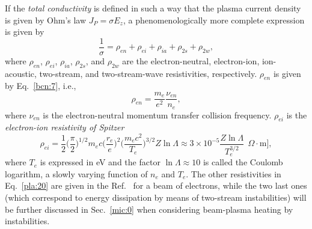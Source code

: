 \documentclass [12pt,a4paper,     ]{report} %
\begin{document}
   If the \emph{total conductivity} is defined in such a way that the plasma current density is given by Ohm's law $J_P=\sigma E_z$, a phenomenologically more complete expression is given by \cite{IYYEN1989-}
%
\begin{equation}\label{pla:20} %
   \frac{1}{\sigma} = \rho_{en} + \rho_{ei} + \rho_{ia} + \rho_{2s} + \rho_{2w},
\end{equation}
%
where $\rho_{en}$, $\rho_{ei}$, $\rho_{ia}$, $\rho_{2s}$, and $\rho_{2w}$ are the electron-neutral, electron-ion, ion-acoustic, two-stream, and two-stream-wave resistivities, respectively.  $\rho_{en}$ is given by Eq.~\eqref{bcn:7}, i.e.,
%
\begin{equation}\label{pla:21} %
        \rho_{en} =  \frac{m_e}{e^2} \frac{\nu_{en}}{n_e},
\end{equation}
%
where $\nu_{en}$ is the electron-neutral momentum transfer collision frequency.  $\rho_{ei}$ is the \emph{electron-ion resistivity of Spitzer} \cite{SPITZ1956-}
%
\begin{equation}\label{pla:22} %
        \rho_{ei} =  \frac{1}{2} \bigl( \frac{\pi}{2}       \bigr)^{1/2}
                           m_e c \bigl( \frac{r_e}{e}       \bigr)^{2}
                                 \bigl( \frac{m_e c^2}{T_e} \bigr)^{3/2}
                                 Z \ln{\Lambda}
   \approx 3 \times 10^{-5} \frac{Z \ln{\Lambda}}{T_e^{3/2}}
              ~~\Omega\cdot\text{m]},
\end{equation}
%
where $T_e$ is expressed in eV and the factor $\ln{\Lambda} \approx 10$ is called the Coulomb logarithm, a slowly varying function of $n_e$ and $T_e$.  The other resistivities in Eq.~\eqref{pla:20} are given in the Ref.~\cite{IYYEN1989-} for a beam of electrons, while the two last ones (which correspond to energy dissipation by means of two-stream instabilities) will be further discussed in Sec.~\ref{mic:0} when considering beam-plasma heating by instabilities.
\end{document}
